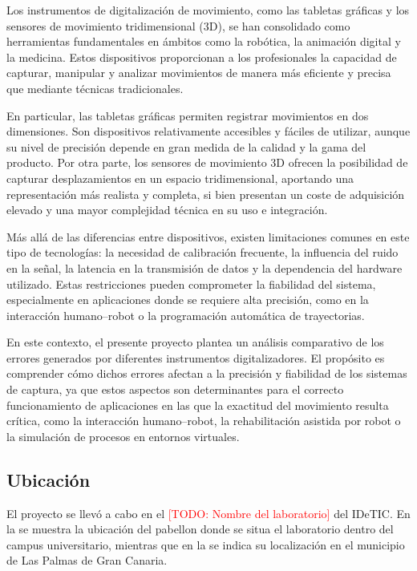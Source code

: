 \documentclass[12pt,a4paper,oneside]{report}
\newcommand{\todo}[1]{\textcolor{red}{[TODO: #1]}}
\newcommand{\figref}[1]{\Cref{#1}}
\begin{document}
Los instrumentos de digitalización de movimiento, como las tabletas gráficas
y los sensores de movimiento tridimensional (3D), se han consolidado como
herramientas fundamentales en ámbitos como la robótica, la animación digital
y la medicina. Estos dispositivos proporcionan a los profesionales la capacidad
de capturar, manipular y analizar movimientos de manera más eficiente y
precisa que mediante técnicas tradicionales.  

En particular, las tabletas gráficas permiten registrar movimientos en dos
dimensiones. Son dispositivos relativamente accesibles y fáciles de utilizar,
aunque su nivel de precisión depende en gran medida de la calidad y la gama
del producto. Por otra parte, los sensores de movimiento 3D ofrecen la
posibilidad de capturar desplazamientos en un espacio tridimensional,
aportando una representación más realista y completa, si bien presentan un
coste de adquisición elevado y una mayor complejidad técnica en su uso e
integración.  

Más allá de las diferencias entre dispositivos, existen limitaciones comunes en
este tipo de tecnologías: la necesidad de calibración frecuente, la influencia
del ruido en la señal, la latencia en la transmisión de datos y la dependencia
del hardware utilizado. Estas restricciones pueden comprometer la fiabilidad
del sistema, especialmente en aplicaciones donde se requiere alta precisión,
como en la interacción humano–robot o la programación automática de
trayectorias.  

En este contexto, el presente proyecto plantea un análisis comparativo de los
errores generados por diferentes instrumentos digitalizadores. El propósito es
comprender cómo dichos errores afectan a la precisión y fiabilidad de los
sistemas de captura, ya que estos aspectos son determinantes para el correcto
funcionamiento de aplicaciones en las que la exactitud del movimiento resulta
crítica, como la interacción humano–robot, la rehabilitación asistida por
robot o la simulación de procesos en entornos virtuales.

\subsection{Ubicación}
El proyecto se llevó a cabo en el \todo{Nombre del laboratorio} del IDeTIC. 
En la \figref{fig:UbicacionCampus} se muestra la ubicación del pabellon donde 
se situa el laboratorio dentro del campus universitario, 
mientras que en la \figref{fig:UbicacionLP} se indica su 
localización en el municipio de Las Palmas de Gran Canaria.
\end{document}
